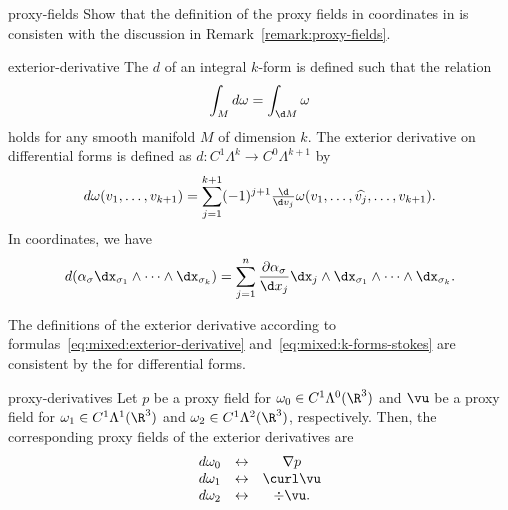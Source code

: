 \begin{Problem}{proxy-fields}
  Show that the definition of the proxy fields in coordinates in
   is consisten with the discussion
  in Remark~\ref{remark:proxy-fields}.
\end{Problem}

\begin{Definition}{exterior-derivative}
  The  $d$ of an integral $k$-form is
  defined such that the relation
  \begin{gather}
    \label{eq:mixed:k-forms-stokes}
    \int_M d\omega = \int_{\d M} \omega
  \end{gather}
  holds for any smooth manifold $M$ of dimension $k$. The exterior
  derivative on differential forms is defined as
  $d:C^1\Lambda^k \to C^0\Lambda^{k+1}$ by
  \begin{gather}
    \label{eq:mixed:exterior-derivative}
    d\omega(v_1,\dots,v_{k+1})
    = \sum_{j=1}^{k+1} (-1)^{j+1} \tfrac{\d}{\d v_j} \omega(v_1,\dots,\widehat{v_j},\dots,v_{k+1}).
  \end{gather}
  In coordinates, we have
  \begin{gather}
    d(\alpha_\sigma \dx_{\sigma_1} \wedge\dots\wedge \dx_{\sigma_k})
    = \sum_{j=1}^n \frac{\partial \alpha_\sigma}{\d x_j}
    \dx_j \wedge \dx_{\sigma_1} \wedge\dots\wedge \dx_{\sigma_k}.
  \end{gather}
\end{Definition}

\begin{remark}
  The definitions of the exterior derivative according to
  formulas~\eqref{eq:mixed:exterior-derivative}
  and~\eqref{eq:mixed:k-forms-stokes} are consistent by the
   for differential forms.
\end{remark}

\begin{Lemma}{proxy-derivatives}
  Let $p$ be a proxy field for $\omega_0\in C^1\Lambda^0(\R^3)$ and
  $\vu$ be a proxy field for $\omega_1\in C^1\Lambda^1(\R^3)$ and
  $\omega_2\in C^1\Lambda^2(\R^3)$, respectively. Then, the
  corresponding proxy fields of the exterior derivatives are
  \begin{gather}
    \begin{matrix}
      d\omega_0 & \leftrightarrow & \nabla p\\
      d\omega_1 & \leftrightarrow & \curl \vu\\
      d\omega_2 & \leftrightarrow & \div \vu.
    \end{matrix}
  \end{gather}
\end{Lemma}

